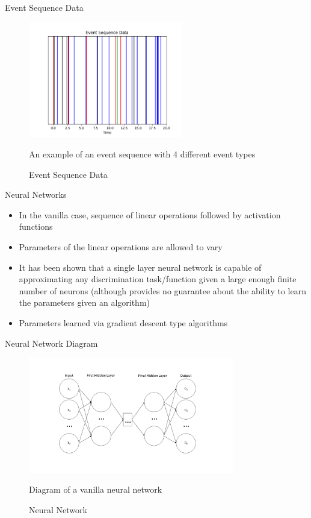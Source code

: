 \documentclass{beamer}
\begin{document}
\begin{frame}{Event Sequence Data}
    \begin{figure}
    \centering
    \includegraphics[width=0.6\textwidth]{figures/Event_Sequence.png}
    \caption{Event Sequence Data}
    \label{fig:Event_seq}
    An example of an event sequence with 4 different event types
    
\end{figure}
\end{frame}
\begin{frame}{Neural Networks}
    \begin{itemize}
        \item In the vanilla case, sequence of linear operations followed by activation functions
        \item Parameters of the linear operations are allowed to vary
        \item It has been shown that a single layer neural network is capable of approximating any discrimination task/function given a large enough finite number of neurons (although provides no guarantee about the ability to learn the parameters given an algorithm)\cite{app}
        \item Parameters learned via gradient descent type algorithms
    \end{itemize}
\end{frame}
\begin{frame}{Neural Network Diagram}
    \begin{figure}
    \centering
\includegraphics[width=0.8\textwidth]{figures/NN.png}
    \caption{Neural Network}
    \label{fig:NN}
    Diagram of a vanilla neural network
\end{figure}
\end{frame}
\end{document}
